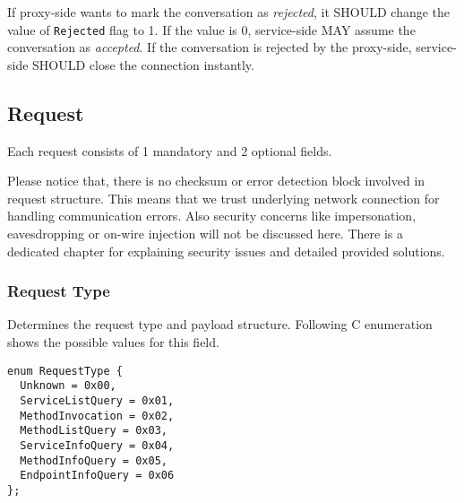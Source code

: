\documentclass[10pt,a4paper]{article}
\begin{document}
If proxy-side wants to mark the conversation as \textit{rejected}, it SHOULD change the value of \texttt{Rejected} flag to 1. If the value is 0, service-side MAY assume the conversation as \textit{accepted}. If the conversation is rejected by the proxy-side, service-side SHOULD close the connection instantly.

\subsection{Request}
Each request consists of 1 mandatory and 2 optional fields.

\begin{flushleft}
\end{flushleft}

Please notice that, there is no checksum or error detection block involved in request structure. This means that we trust underlying network connection for handling communication errors. Also security concerns like impersonation, eavesdropping or on-wire injection will not be discussed here. There is a dedicated chapter for explaining security issues and detailed provided solutions.

\subsubsection{Request Type}
Determines the request type and payload structure. Following C enumeration shows the possible values for this field.

\begin{verbatim}
enum RequestType { 
  Unknown = 0x00, 
  ServiceListQuery = 0x01, 
  MethodInvocation = 0x02,
  MethodListQuery = 0x03,
  ServiceInfoQuery = 0x04,
  MethodInfoQuery = 0x05,
  EndpointInfoQuery = 0x06
};
\end{verbatim}
\end{document}
